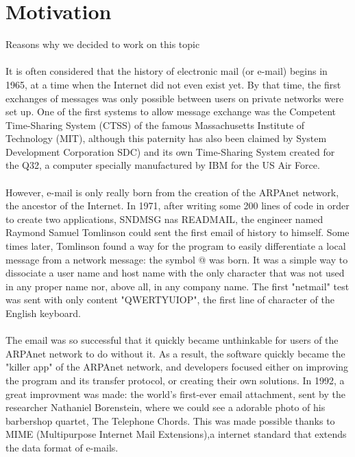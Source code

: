 
\section{Motivation}

Reasons why we decided to work on this topic
\paragraph{}
It is often considered that the history of electronic mail (or e-mail) begins in 1965, at a time when the Internet did not even exist yet. By that time, the first exchanges of messages was only possible between users on private networks were set up. One of the first systems to allow message exchange was the Competent Time-Sharing System (CTSS) of the famous Massachusetts Institute of Technology (MIT), although this paternity has also been claimed by System Development Corporation SDC) and its own Time-Sharing System created for the Q32, a computer specially manufactured by IBM for the US Air Force.
\paragraph{}
However, e-mail is only really born from the creation of the ARPAnet network, the ancestor of the Internet. In 1971, after writing some 200 lines of code in order to create two applications, SNDMSG nas READMAIL, the engineer named Raymond Samuel Tomlinson could sent the first email of history to himself. Some times later, 
Tomlinson found a way for the program to easily differentiate a local message from a network message: the symbol @ was born. It was a simple way to ​​dissociate a user name and host name with the only character that was not used in any proper name nor, above all, in any company name. The first "netmail" test was sent with only content "QWERTYUIOP", the first line of character of the English keyboard.
\paragraph{}
The email was so successful that it quickly became unthinkable for users of the ARPAnet network to do without it. As a result, the software quickly became the "killer app"  of the ARPAnet network, and developers focused either on improving the program and its transfer protocol, or creating their own solutions. In 1992, a great improvment was made: the world's first-ever email attachment, sent by the researcher Nathaniel Borenstein, where we could see a adorable photo of his barbershop quartet, The Telephone Chords. This was made possible thanks to MIME (Multipurpose Internet Mail Extensions),a internet standard that extends the data format of e-mails.
